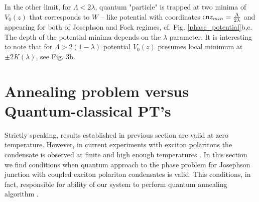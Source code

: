 \documentclass[aps, pre, preprint, groupedaddress, superscriptaddress, showkeys, showpacs] {revtex4-1}
\begin{document}
In the other limit, for $\Lambda < 2 \lambda$, quantum "particle" is trapped at two minima of $V_0(z)$ that corresponds to $W$ -- like potential with coordinates $\textrm{cn}{z_{min}} = \frac{\Lambda}{2 \lambda}$ and appearing for both of Josephson and Fock regimes, cf. Fig. \ref{phase_potential}b,c.  
The depth of the potential minima depends on the $\lambda$ parameter.
It is interesting to note that for $\Lambda > 2(1 - \lambda)$ potential $V_0(z)$ presumes local minimum at $\pm 2 K(\lambda)$, see Fig. 3b.

%

%
%
%
%


\section{Annealing problem versus Quantum-classical PT's \label{sec:quantum_classical}}

Strictly speaking, results established in previous section are valid at zero temperature. However, in current experiments with exciton polaritons  the condensate is observed at finite and high enough temperatures \cite{Sanvitto,Guillet}.
In this section we find conditions when quantum approach to the phase problem for Josephson junction with coupled exciton polariton condensates is valid. This conditions, in fact, responsible for ability of our system to perform quantum annealing algorithm \cite{Das}.
\end{document}
